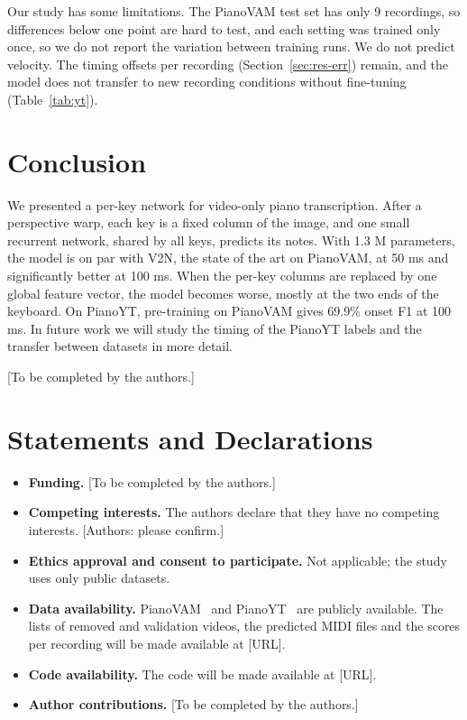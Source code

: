 \documentclass[pdflatex,sn-mathphys-num]{sn-jnl}
\begin{document}
Our study has some limitations. The PianoVAM test set has only 9 recordings, so differences below one point are hard to test, and each setting was trained only once, so we do not report the variation between training runs. We do not predict velocity. The timing offsets per recording (Section~\ref{sec:res-err}) remain, and the model does not transfer to new recording conditions without fine-tuning (Table~\ref{tab:yt}).

\section{Conclusion}\label{sec:conclusion}

We presented a per-key network for video-only piano transcription. After a perspective warp, each key is a fixed column of the image, and one small recurrent network, shared by all keys, predicts its notes. With 1.3 M parameters, the model is on par with V2N, the state of the art on PianoVAM, at 50 ms and significantly better at 100 ms. When the per-key columns are replaced by one global feature vector, the model becomes worse, mostly at the two ends of the keyboard. On PianoYT, pre-training on PianoVAM gives 69.9\% onset F1 at 100 ms. In future work we will study the timing of the PianoYT labels and the transfer between datasets in more detail.

[To be completed by the authors.]

\section*{Statements and Declarations}

\begin{itemize}
\item \textbf{Funding.} [To be completed by the authors.]
\item \textbf{Competing interests.} The authors declare that they have no competing interests. [Authors: please confirm.]
\item \textbf{Ethics approval and consent to participate.} Not applicable; the study uses only public datasets.
\item \textbf{Data availability.} PianoVAM~\cite{kim2025pianovam} and PianoYT~\cite{su2020} are publicly available. The lists of removed and validation videos, the predicted MIDI files and the scores per recording will be made available at [URL].
\item \textbf{Code availability.} The code will be made available at [URL].
\item \textbf{Author contributions.} [To be completed by the authors.]
\end{itemize}
\end{document}
